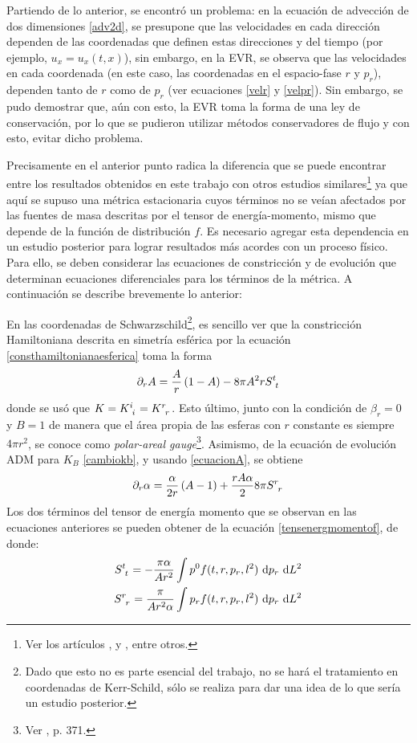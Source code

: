 \documentclass[11pt,twoside,openright,spanish]{report}
\numberwithin{equation}{chapter}
\numberwithin{figure}{chapter}
\numberwithin{table}{chapter}
\begin{document}
Partiendo de lo anterior, se encontró un problema: en la ecuación de advección de dos dimensiones \eqref{adv2d}, se presupone que las velocidades en cada dirección dependen de las coordenadas que definen estas direcciones y del tiempo (por ejemplo, $u_x=u_x(t,x)$), sin embargo, en la EVR, se observa que las velocidades en cada coordenada (en este caso, las coordenadas en el espacio-fase $r$ y $p_r$), dependen tanto de $r$ como de $p_r$ (ver ecuaciones \eqref{velr} y \eqref{velpr}). Sin embargo, se pudo demostrar que, aún con esto, la EVR toma la forma de una ley de conservación, por lo que se pudieron utilizar métodos conservadores de flujo y con esto, evitar dicho problema.

Precisamente en el anterior punto radica la diferencia que se puede encontrar entre los resultados obtenidos en este trabajo con otros estudios similares\footnote{Ver los artículos \citet{akbariancritical}, \citet{fujiwara1983} y \citet{Stevenson2003}, entre otros.} ya que aquí se supuso una métrica estacionaria cuyos términos no se veían afectados por las fuentes de masa descritas por el tensor de energía-momento, mismo que depende de la función de distribución $f$. Es necesario agregar esta dependencia en un estudio posterior para lograr resultados más acordes con un proceso físico. Para ello, se deben considerar las ecuaciones de constricción y de evolución que determinan ecuaciones diferenciales para los términos de la métrica. A continuación se describe brevemente lo anterior:

En las coordenadas de Schwarzschild\footnote{Dado que esto no es parte esencial del trabajo, no se hará el tratamiento en coordenadas de Kerr-Schild, sólo se realiza para dar una idea de lo que sería un estudio posterior.}, es sencillo ver que la constricción Hamiltoniana descrita en simetría esférica por la ecuación \eqref{consthamiltonianaesferica} toma la forma 
\begin{equation}
\partial_r A=\frac{A}{r}\left(1-A\right)-8\pi A^2r\tensor{S}{^t_t}
\label{ecuacionA}
\end{equation}
donde se usó que $K=\tensor{K}{^i_i}=\tensor{K}{^r_r}$. Esto último, junto con la condición de $\beta_r=0$ y $B=1$ de manera que el área propia de las esferas con $r$ constante es siempre $4\pi r^2$, se conoce como \textit{polar-areal gauge}\footnote{Ver \citet{alcubierre}, p. 371.}. Asimismo, de la ecuación de evolución ADM para $K_B$ \eqref{cambiokb}, y usando \eqref{ecuacionA}, se obtiene
\begin{equation}
\partial_r \alpha=\frac{\alpha}{2r}\left(A-1\right)+\frac{rA\alpha}{2}8\pi \tensor{S}{^r_r}
\label{ecuacionalpha}
\end{equation}
Los dos términos del tensor de energía momento que se observan en las ecuaciones anteriores se pueden obtener de la ecuación \eqref{tensenergmomentof}, de donde:
\begin{eqnarray}
\tensor{S}{^t_t}=-\frac{\pi\alpha}{Ar^2}\int p^0 f(t,r,p_r,l^2)\ \text{d}p_r\ \text{d}L^2\\
\tensor{S}{^r_r}=\frac{\pi}{Ar^2\alpha}\int p_rf(t,r,p_r,l^2)\ \text{d}p_r\ \text{d}L^2
\end{eqnarray}
\end{document}
